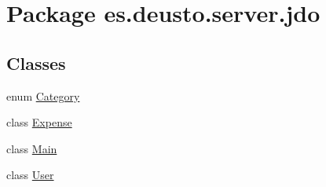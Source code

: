 \hypertarget{namespacees_1_1deusto_1_1server_1_1jdo}{}\section{Package es.\+deusto.\+server.\+jdo}
\label{namespacees_1_1deusto_1_1server_1_1jdo}
\subsection*{Classes}
\begin{DoxyCompactItemize}
\item 
enum \hyperlink{enumes_1_1deusto_1_1server_1_1jdo_1_1_category}{Category}
\item 
class \hyperlink{classes_1_1deusto_1_1server_1_1jdo_1_1_expense}{Expense}
\item 
class \hyperlink{classes_1_1deusto_1_1server_1_1jdo_1_1_main}{Main}
\item 
class \hyperlink{classes_1_1deusto_1_1server_1_1jdo_1_1_user}{User}
\end{DoxyCompactItemize}
